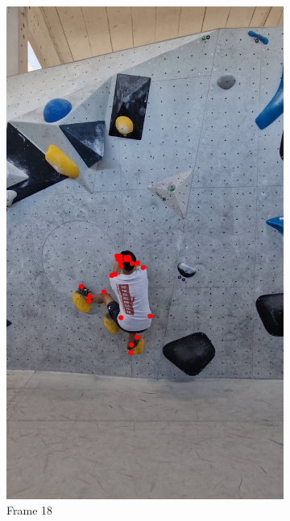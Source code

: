 \documentclass[./main.tex]{subfiles}
\begin{document}
\begin{figure}[htbp]
    \begin{subfigure}{0.3\textwidth}
        \centering
        \includegraphics[width=\textwidth]{entities/CA_18.png}
        \caption{Frame 18}
    \end{subfigure}
    \begin{subfigure}{0.3\textwidth}
        \centering

\end{subfigure}
\end{figure}
\end{document}
